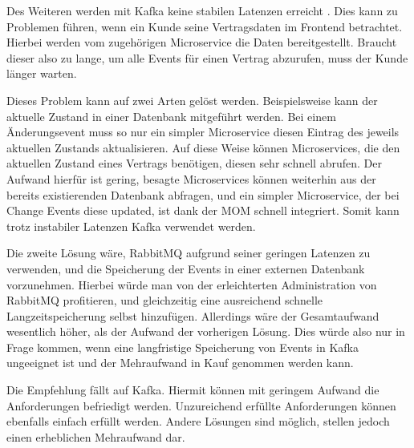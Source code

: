 Des Weiteren werden mit Kafka keine stabilen Latenzen erreicht
\cite{Linkedin:online}. Dies kann zu
Problemen führen, wenn ein Kunde seine Vertragsdaten im Frontend betrachtet.
Hierbei werden vom zugehörigen Microservice die Daten bereitgestellt. Braucht
dieser also zu lange, um alle Events für einen Vertrag abzurufen, muss der
Kunde länger warten.

Dieses Problem kann auf zwei Arten gelöst werden.
Beispielsweise kann der aktuelle Zustand in einer Datenbank mitgeführt werden.
Bei einem Änderungsevent muss so nur ein simpler Microservice diesen Eintrag
des jeweils aktuellen Zustands aktualisieren. Auf diese Weise können
Microservices, die den aktuellen Zustand eines Vertrags benötigen, diesen sehr
schnell abrufen.
Der Aufwand hierfür ist gering, besagte Microservices
können weiterhin aus der bereits existierenden Datenbank abfragen, und ein
simpler Microservice, der bei Change Events diese updated, ist dank der MOM
schnell integriert. Somit kann trotz instabiler Latenzen Kafka verwendet werden.

Die zweite Lösung wäre, RabbitMQ aufgrund seiner geringen Latenzen zu verwenden,
und die Speicherung der Events in einer externen Datenbank vorzunehmen.
Hierbei würde man von der erleichterten Administration von RabbitMQ profitieren,
und gleichzeitig eine ausreichend schnelle Langzeitspeicherung selbst
hinzufügen. Allerdings wäre der Gesamtaufwand wesentlich höher, als der Aufwand
der vorherigen Lösung. Dies würde also nur in Frage kommen, wenn eine
langfristige Speicherung von Events in Kafka ungeeignet ist und der Mehraufwand
in Kauf genommen werden kann.

Die Empfehlung fällt auf Kafka. Hiermit können mit geringem Aufwand die Anforderungen
befriedigt werden. Unzureichend erfüllte Anforderungen können ebenfalls einfach
erfüllt werden. Andere Lösungen sind möglich, stellen jedoch einen erheblichen
Mehraufwand dar.
